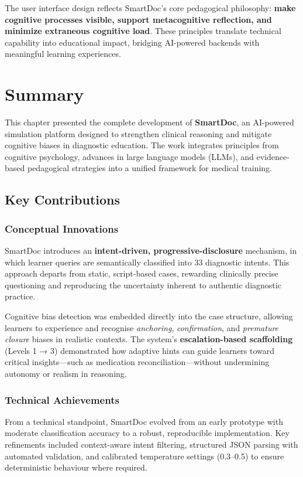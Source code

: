 \medskip
The user interface design reflects SmartDoc's core pedagogical philosophy: \textbf{make cognitive processes visible, support metacognitive reflection, and minimize extraneous cognitive load}. These principles translate technical capability into educational impact, bridging AI-powered backends with meaningful learning experiences.

\section{Summary}
\label{sec:summary}

This chapter presented the complete development of \textbf{SmartDoc}, an AI-powered simulation platform designed to strengthen clinical reasoning and mitigate cognitive biases in diagnostic education. The work integrates principles from cognitive psychology, advances in large language models (LLMs), and evidence-based pedagogical strategies into a unified framework for medical training.

\subsection{Key Contributions}

\subsubsection*{Conceptual Innovations}
SmartDoc introduces an \textbf{intent-driven, progressive-disclosure} mechanism, in which learner queries are semantically classified into 33 diagnostic intents. This approach departs from static, script-based cases, rewarding clinically precise questioning and reproducing the uncertainty inherent to authentic diagnostic practice.

Cognitive bias detection was embedded directly into the case structure, allowing learners to experience and recognise \emph{anchoring}, \emph{confirmation}, and \emph{premature closure} biases in realistic contexts. The system’s \textbf{escalation-based scaffolding} (Levels 1 → 3) demonstrated how adaptive hints can guide learners toward critical insights—such as medication reconciliation—without undermining autonomy or realism in reasoning.

\subsubsection*{Technical Achievements}
From a technical standpoint, SmartDoc evolved from an early prototype with moderate classification accuracy to a robust, reproducible implementation. Key refinements included context-aware intent filtering, structured JSON parsing with automated validation, and calibrated temperature settings (0.3–0.5) to ensure deterministic behaviour where required.

